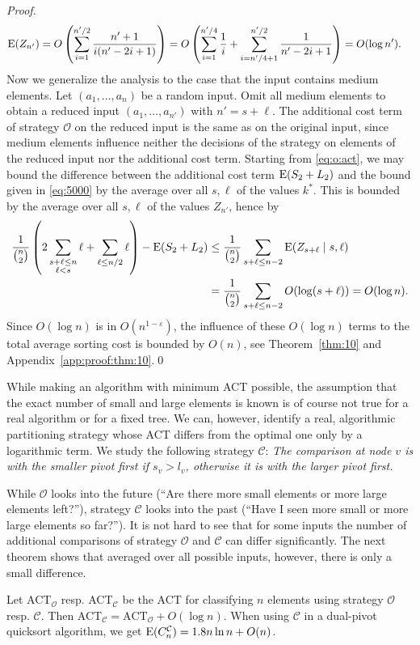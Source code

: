 \documentclass[prodmode,acmtalg]{acmsmall}
\newcommand{\E}{\textnormal{\textrm{E}}}
\begin{document}
\begin{proof}
\begin{align*}
    \E(Z_{n'}) &= O\left(\sum_{i = 1}^{n'/2} \frac{n'+1}{i(n' - 2i + 1)}\right) = O\left(\sum_{i = 1}^{n'/4} \frac{1}{i} + 
    \sum_{i = n'/4 + 1}^{n'/2}\frac{1}{n' - 2i  + 1}\right) = O(\log n').
\end{align*}
Now we generalize the analysis to the case that the input contains medium
elements. Let $(a_1, \ldots, a_n)$ be a random input. Omit all
medium elements to obtain a reduced input $(a_1, \ldots, a_{n'})$ with $n' = s
+ \ell$.  The additional cost term of strategy $\mathcal{O}$ on the reduced
input is the same as on the original input, since medium elements
influence neither the decisions of the strategy on elements of the reduced input 
nor the additional cost term.
Starting from \eqref{eq:o:act}, we may bound the difference between the additional cost 
term $\E(S_2 + L_2)$ and the bound given in \eqref{eq:5000} by the 
average over all $s, \ell$ of the values $k^\ast$. This is bounded by the average over all $s, \ell$
of the values $Z_{n'}$, hence by
\begin{align*}
    \frac{1}{\binom{n}{2}} \left( 2 \sum_{\substack{s + \ell \leq n \\\ell < s}} \ell + \sum_{\ell \leq n/2} \ell\right) - \E(S_2 + L_2) & \leq \frac{1}{\binom{n}{2}} \sum_{s + \ell \leq n - 2} \E(Z_{s + \ell} \mid
    s, \ell) \\ &= \frac{1}{\binom{n}{2}} \sum_{s + \ell \leq n - 2} O(\log (s+\ell)) = 
    O(\log n).
\end{align*}
Since $O(\log n)$ is in $O(n^{1-\varepsilon})$, the influence of these $O(\log n)$ terms
to the total average sorting cost is bounded by $O(n)$, see Theorem~\ref{thm:10} and
Appendix~\ref{app:proof:thm:10}.\qed
\end{proof}
While making an algorithm with minimum ACT possible, the assumption that the exact
number of small and large elements is known is of course not true for a real
algorithm or for a fixed tree. We can, however, identify a real, algorithmic
partitioning strategy whose ACT differs from the optimal one only by a
logarithmic term.  We study the following strategy $\mathcal{C}$: \emph{The
comparison at node $v$ is with the smaller pivot first if $s_v > l_v$,
otherwise it is with the larger pivot first.}

While $\mathcal{O}$ looks into the future (``Are there more small elements or
more large elements left?''), strategy $\mathcal{C}$ looks into the past
(``Have I seen more small or more large elements so far?'').
It is not hard to see that for some inputs the number of additional
comparisons of
strategy $\mathcal{O}$ and $\mathcal{C}$ can differ significantly. The next
theorem shows that averaged over all possible inputs, however, there is only a
small
difference.
\begin{theorem}\label{thm:optimal:strategies:diff}
    Let ACT$_\mathcal{O}$ resp. ACT$_\mathcal{C}$ be the ACT for 
    classifying $n$ elements using strategy $\mathcal{O}$ resp.
    $\mathcal{C}$. Then
    ACT$_\mathcal{C} = \text{ACT}_\mathcal{O} + O(\log n)$.
   When using $\mathcal{C}$ in a dual-pivot quicksort algorithm, we get
$\E(C^\mathcal{C}_n) = 1.8 n \ln n + O(n)$.
\end{theorem}
\end{document}
